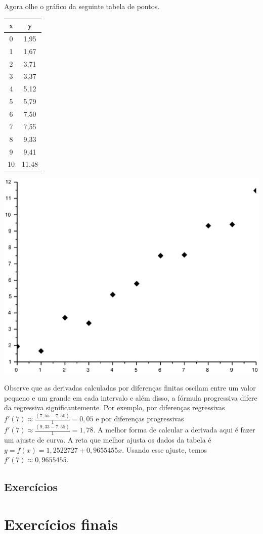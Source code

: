 Agora olhe o gráfico da seguinte tabela de pontos.
\begin{center}
\begin{tabular}{|c|c|}
\hline
x&y\\
\hline
0    & 1,95  \\
\hline
    1&     1,67  \\
		\hline
    2 &    3,71  \\
		\hline
    3  &   3,37  \\
		\hline
    4   &  5,12   \\
		\hline
    5&     5,79  \\
		\hline
    6 &    7,50  \\
		\hline
    7  &   7,55  \\
		\hline
    8   &  9,33  \\
		\hline
    9   &  9,41   \\
		\hline
    10  &  11,48  \\
		\hline
\end{tabular}  
\end{center}
\begin{center}
\includegraphics[scale=0.5]{./cap_derivacao/pics/graf_der.eps}
\end{center}

Observe que as derivadas calculadas por diferenças finitas oscilam entre um valor pequeno e um grande em cada intervalo e além disso, a fórmula progressiva difere da regressiva significantemente. Por exemplo, por diferenças regressivas $f'(7)\approx \frac{(7,55 -  7,50)}{1}=0,05$ e por diferenças progressivas $f'(7)\approx \frac{(9,33 -  7,55)}{1}=1,78$. A melhor forma de calcular a derivada aqui é fazer um ajuste de curva. A reta que melhor ajusta os dados da tabela é $y=f(x)=1,2522727+0,9655455x$. Usando esse ajuste, temos $f'(7)\approx 0,9655455$.

\subsection*{Exercícios}

\emconstrucao


\section{Exercícios finais}

\emconstrucao

% 